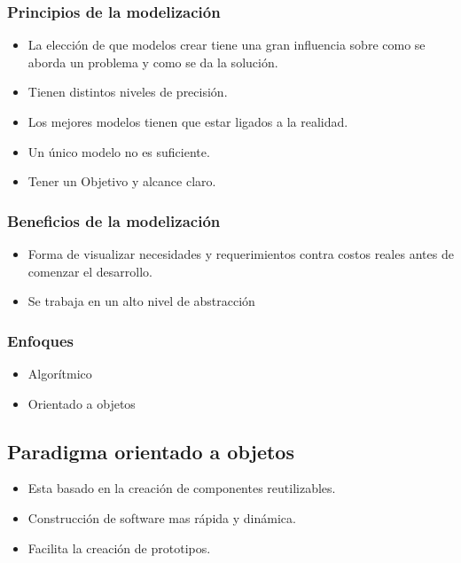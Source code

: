\documentclass[titlepage,a4paper]{article}
\begin{document}
\subsubsection*{Principios de la modelización}
    \begin{itemize}
        \item La elección de que modelos crear tiene una gran influencia sobre como se aborda un problema y como se da la solución.
        \item Tienen distintos niveles de precisión.
        \item Los mejores modelos tienen que estar ligados a la realidad.
        \item Un único modelo no es suficiente.
        \item Tener un Objetivo y alcance claro.
    \end{itemize}

\subsubsection*{Beneficios de la modelización}
    \begin{itemize}
        \item Forma de visualizar necesidades y requerimientos contra costos reales antes de comenzar el desarrollo.
        \item Se trabaja en un alto nivel de abstracción
    \end{itemize}


\subsubsection*{Enfoques}
    \begin{itemize}
        \item Algorítmico
        \item Orientado a objetos
    \end{itemize}

\subsection{Paradigma orientado a objetos}
    \begin{itemize}
        \item Esta basado en la creación de componentes reutilizables.
        \item Construcción de software mas rápida y dinámica.
        \item Facilita la creación de prototipos.
    \end{itemize}
\end{document}
